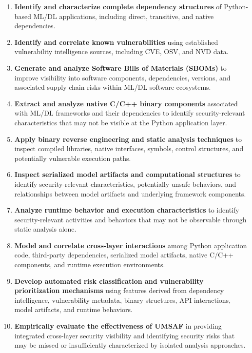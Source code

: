 \documentclass[
  12pt,
  letterpaper,
  oneside]{report}
\begin{document}
\begin{enumerate}
\def\labelenumi{\arabic{enumi}.}
\item
  \textbf{Identify and characterize complete dependency structures} of
  Python-based ML/DL applications, including direct, transitive, and
  native dependencies.
\item
  \textbf{Identify and correlate known vulnerabilities} using
  established vulnerability intelligence sources, including CVE, OSV,
  and NVD data.
\item
  \textbf{Generate and analyze Software Bills of Materials (SBOMs)} to
  improve visibility into software components, dependencies, versions,
  and associated supply-chain risks within ML/DL software ecosystems.
\item
  \textbf{Extract and analyze native C/C++ binary components} associated
  with ML/DL frameworks and their dependencies to identify
  security-relevant characteristics that may not be visible at the
  Python application layer.
\item
  \textbf{Apply binary reverse engineering and static analysis
  techniques} to inspect compiled libraries, native interfaces, symbols,
  control structures, and potentially vulnerable execution paths.
\item
  \textbf{Inspect serialized model artifacts and computational
  structures} to identify security-relevant characteristics, potentially
  unsafe behaviors, and relationships between model artifacts and
  underlying framework components.
\item
  \textbf{Analyze runtime behavior and execution characteristics} to
  identify security-relevant activities and behaviors that may not be
  observable through static analysis alone.
\item
  \textbf{Model and correlate cross-layer interactions} among Python
  application code, third-party dependencies, serialized model
  artifacts, native C/C++ components, and runtime execution
  environments.
\item
  \textbf{Develop automated risk classification and vulnerability
  prioritization mechanisms} using features derived from dependency
  intelligence, vulnerability metadata, binary structures, API
  interactions, model artifacts, and runtime behaviors.
\item
  \textbf{Empirically evaluate the effectiveness of UMSAF} in providing
  integrated cross-layer security visibility and identifying security
  risks that may be missed or insufficiently characterized by isolated
  analysis approaches.
\end{enumerate}
\end{document}
